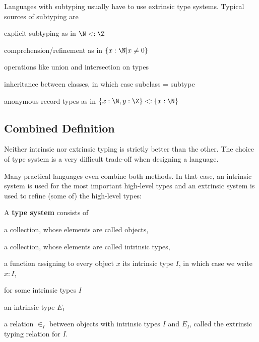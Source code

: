 \begin{remark}[Subtyping]
Languages with subtyping usually have to use extrinsic type systems.
Typical sources of subtyping are
\begin{compactitem}
 \item explicit subtyping as in $\N<:\Z$
 \item comprehension/refinement as in $\{x:\N|x\neq 0\}$
 \item operations like union and intersection on types
 \item inheritance between classes, in which case subclass = subtype
 \item anonymous record types as in $\{x:\N,y:\Z\}<:\{x:\N\}$
\end{compactitem}
\end{remark}

\subsection{Combined Definition}

Neither intrinsic nor extrinsic typing is strictly better than the other.
The choice of type system is a very difficult trade-off when designing a language.

Many practical languages even combine both methods.
In that case, an intrinsic system is used for the most important high-level types and an extrinsic system is used to refine (some of) the high-level types:

\begin{definition}
A \textbf{type system} consists of
\begin{compactitem}
 \item a collection, whose elements are called objects,
 \item a collection, whose elements are called intrinsic types,
 \item a function assigning to every object $x$ its intrinsic type $I$, in which case we write $x:I$,
 \item for some intrinsic types $I$
  \begin{compactitem}
   \item an intrinsic type $E_I$
   \item a relation $\in_I$ between objects with intrinsic types $I$ and $E_I$, called the extrinsic typing relation for $I$.
  \end{compactitem}
\end{compactitem}
\end{definition}

